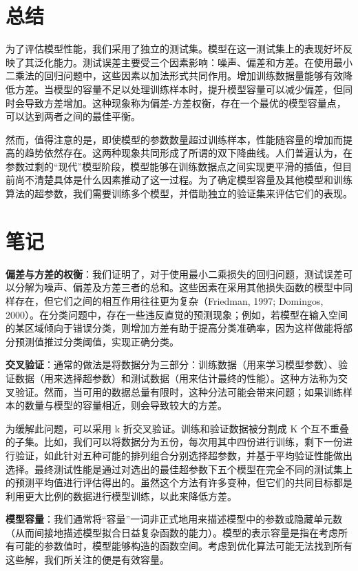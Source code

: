 \documentclass[lang=cn,newtx,10pt,scheme=chinese]{elegantbook}
\begin{document}
\section{总结}

为了评估模型性能，我们采用了独立的测试集。模型在这一测试集上的表现好坏反映了其泛化能力。测试误差主要受三个因素影响：噪声、偏差和方差。在使用最小二乘法的回归问题中，这些因素以加法形式共同作用。增加训练数据量能够有效降低方差。当模型的容量不足以处理训练样本时，提升模型容量可以减少偏差，但同时会导致方差增加。这种现象称为偏差-方差权衡，存在一个最优的模型容量点，可以达到两者之间的最佳平衡。

然而，值得注意的是，即使模型的参数数量超过训练样本，性能随容量的增加而提高的趋势依然存在。这两种现象共同形成了所谓的双下降曲线。人们普遍认为，在参数过剩的“现代”模型阶段，模型能够在训练数据点之间实现更平滑的插值，但目前尚不清楚具体是什么因素推动了这一过程。为了确定模型容量及其他模型和训练算法的超参数，我们需要训练多个模型，并借助独立的验证集来评估它们的表现。
\section{笔记}
\textbf{偏差与方差的权衡}：我们证明了，对于使用最小二乘损失的回归问题，测试误差可以分解为噪声、偏差及方差三者的总和。这些因素在采用其他损失函数的模型中同样存在，但它们之间的相互作用往往更为复杂（Friedman, 1997; Domingos, 2000）。在分类问题中，存在一些违反直觉的预测现象；例如，若模型在输入空间的某区域倾向于错误分类，则增加方差有助于提高分类准确率，因为这样做能将部分预测值推过分类阈值，实现正确分类。

\textbf{交叉验证}：通常的做法是将数据分为三部分：训练数据（用来学习模型参数）、验证数据（用来选择超参数）和测试数据（用来估计最终的性能）。这种方法称为交叉验证。然而，当可用的数据总量有限时，这种分法可能会带来问题；如果训练样本的数量与模型的容量相近，则会导致较大的方差。

为缓解此问题，可以采用 k 折交叉验证。训练和验证数据被分割成 K 个互不重叠的子集。比如，我们可以将数据分为五份，每次用其中四份进行训练，剩下一份进行验证，如此针对五种可能的排列组合分别选择超参数，并基于平均验证性能做出选择。最终测试性能是通过对选出的最佳超参数下五个模型在完全不同的测试集上的预测平均值进行评估得出的。虽然这个方法有许多变种，但它们的共同目标都是利用更大比例的数据进行模型训练，以此来降低方差。

\textbf{模型容量}：我们通常将“容量”一词非正式地用来描述模型中的参数或隐藏单元数（从而间接地描述模型拟合日益复杂函数的能力）。模型的表示容量是指在考虑所有可能的参数值时，模型能够构造的函数空间。考虑到优化算法可能无法找到所有这些解，我们所关注的便是有效容量。
\end{document}

